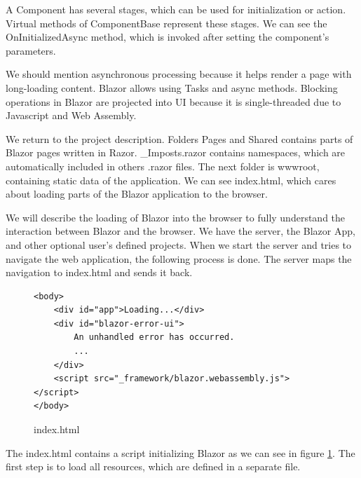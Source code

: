 \par
A Component has several stages, which can be used for initialization or action.
Virtual methods of ComponentBase represent these stages.
We can see the OnInitializedAsync method, which is invoked after setting the component's parameters.
\par
We should mention asynchronous processing because it helps render a page with long-loading content.
Blazor allows using Tasks and async methods.
Blocking operations in Blazor are projected into UI because it is single-threaded due to Javascript and Web Assembly.
\par
We return to the project description. 
Folders Pages and Shared contains parts of Blazor pages written in Razor.
\_Imposts.razor contains namespaces, which are automatically included in others .razor files.
The next folder is wwwroot, containing static data of the application.
We can see index.html, which cares about loading parts of the Blazor application to the browser.
\par
{}
\par
We will describe the loading of Blazor into the browser to fully understand the interaction between Blazor and the browser.
We have the server, the Blazor App, and other optional user's defined projects. 
When we start the server and tries to navigate the web application, the following process is done.
The server maps the navigation to index.html and sends it back.
\par
{}
\begin{figure}
\begin{lstlisting}
<body>
    <div id="app">Loading...</div>
    <div id="blazor-error-ui">
        An unhandled error has occurred.
		...
    </div>
    <script src="_framework/blazor.webassembly.js"></script>
</body>

\end{lstlisting}
\caption{index.html}
\label{img06:index}
\end{figure}
\par 
The index.html contains a script initializing Blazor as we can see in figure \ref{img06:index}.
The first step is to load all resources, which are defined in a separate file.

